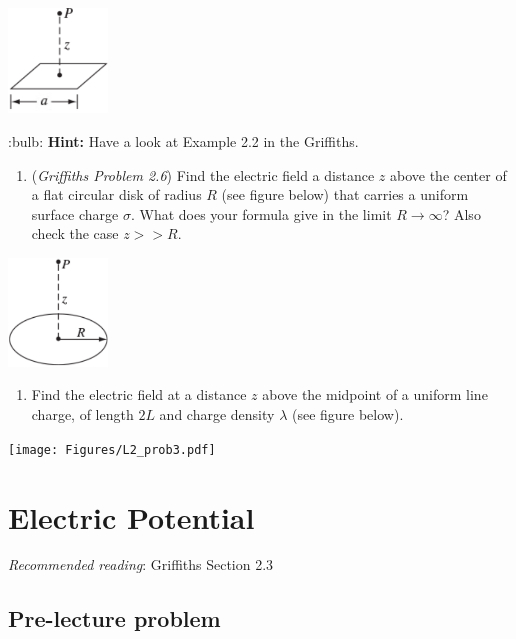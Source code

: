 \documentclass[
  letterpaper,
  DIV=11,
  numbers=noendperiod]{scrreprt}
\providecommand{\tightlist}{%
  \setlength{\itemsep}{0pt}\setlength{\parskip}{0pt}}\usepackage{longtable,booktabs,array}
\begin{document}
\includegraphics[width=1.04167in,height=\textheight]{Figures/L1_prob3.png}

:bulb: \textbf{Hint:} Have a look at Example 2.2 in the Griffiths.

\begin{enumerate}
\def\labelenumi{\arabic{enumi})}
\setcounter{enumi}{3}
\tightlist
\item
  (\emph{Griffiths Problem 2.6}) Find the electric field a distance
  \(z\) above the center of a flat circular disk of radius \(R\) (see
  figure below) that carries a uniform surface charge \(\sigma\). What
  does your formula give in the limit \(R \rightarrow \infty\)? Also
  check the case \(z >> R\).
\end{enumerate}

\includegraphics[width=1.04167in,height=\textheight]{Figures/L1_prob4.png}

\begin{enumerate}
\def\labelenumi{\arabic{enumi})}
\setcounter{enumi}{4}
\tightlist
\item
  Find the electric field at a distance \(z\) above the midpoint of a
  uniform line charge, of length \(2L\) and charge density \(\lambda\)
  (see figure below).
\end{enumerate}

\texttt{[image: Figures/L2\_prob3.pdf]}


\chapter{Electric Potential}\label{electric-potential}

\emph{Recommended reading}: Griffiths Section 2.3

\section{Pre-lecture problem}\label{pre-lecture-problem-1}
\end{document}
